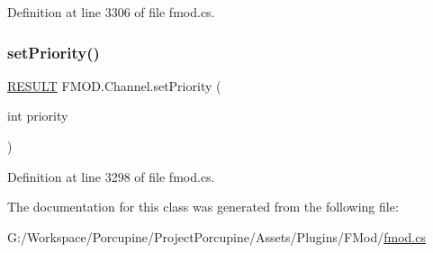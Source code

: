 Definition at line 3306 of file fmod.\+cs.

\mbox{\label{class_f_m_o_d_1_1_channel_a0351346750ba8b05f5d4a4707bbf5222}} 
\subsubsection{\texorpdfstring{set\+Priority()}{setPriority()}}
{\footnotesize\ttfamily \hyperlink{namespace_f_m_o_d_a305d1176ef3f8c8815861a60407ac33d}{R\+E\+S\+U\+LT} F\+M\+O\+D.\+Channel.\+set\+Priority (\begin{DoxyParamCaption}\item[{int}]{priority }\end{DoxyParamCaption})}



Definition at line 3298 of file fmod.\+cs.



The documentation for this class was generated from the following file\+:\begin{DoxyCompactItemize}
\item 
G\+:/\+Workspace/\+Porcupine/\+Project\+Porcupine/\+Assets/\+Plugins/\+F\+Mod/\hyperlink{fmod_8cs}{fmod.\+cs}\end{DoxyCompactItemize}

